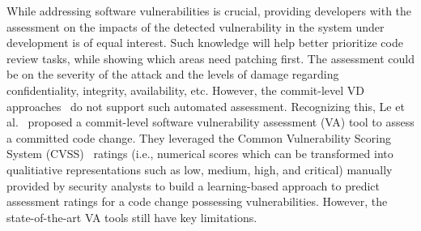 While addressing software vulnerabilities is crucial, providing developers with the assessment on the impacts of the detected vulnerability in the system under development is of equal interest. 
Such knowledge will help better prioritize code review tasks, while showing which areas need patching first.
The assessment could be on the severity of the attack and the levels of damage regarding confidentiality, integrity, availability, etc. However, the commit-level VD approaches~\cite{perl2015vccfinder,zhou2017automated,chen2019large} do not support such automated assessment. 
Recognizing this, Le et al.~\cite{deepCVA-ase21} proposed a commit-level software vulnerability assessment (VA) tool to assess a committed code change. They leveraged the Common Vulnerability Scoring System (CVSS)~\cite{first-website} ratings (i.e., numerical scores which can be transformed into qualitiative representations such as low, medium, high, and critical) manually provided by security analysts to build a learning-based approach to predict assessment ratings for a code change possessing vulnerabilities.
However, the state-of-the-art VA tools still have key limitations.

